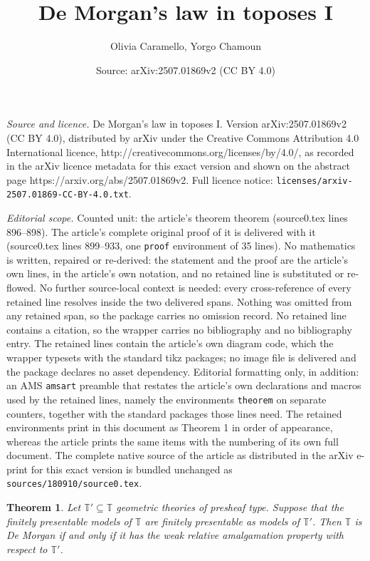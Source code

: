 \documentclass[10pt,a4paper]{amsart}
\title{De Morgan's law in toposes I}
\author{Olivia Caramello, Yorgo Chamoun}
\date{Source: arXiv:2507.01869v2 (CC BY 4.0)}
\newtheorem{theorem}{Theorem}
\newcommand{\T}{\mathbb{T}}
\begin{document}
\maketitle

\noindent\emph{Source and licence.} De Morgan's law in toposes I. Version arXiv:2507.01869v2 (CC BY 4.0), distributed by arXiv under the Creative Commons Attribution 4.0 International licence, http://creativecommons.org/licenses/by/4.0/, as recorded in the arXiv licence metadata for this exact version and shown on the abstract page https://arxiv.org/abs/2507.01869v2. Full licence notice: \texttt{licenses/arxiv-2507.01869-CC-BY-4.0.txt}.\par\smallskip

\noindent\textit{Editorial scope.} Counted unit: the article's theorem theorem (source0.tex lines 896--898). The article's complete original proof of it is delivered with it (source0.tex lines 899--933, one \texttt{proof} environment of 35 lines). No mathematics is written, repaired or re-derived: the statement and the proof are the article's own lines, in the article's own notation, and no retained line is substituted or re-flowed.  No further source-local context is needed: every cross-reference of every retained line resolves inside the two delivered spans.  Nothing was omitted from any retained span, so the package carries no omission record.  No retained line contains a citation, so the wrapper carries no bibliography and no bibliography entry.  The retained lines contain the article's own diagram code, which the wrapper typesets with the standard tikz packages; no image file is delivered and the package declares no asset dependency.  Editorial formatting only, in addition: an AMS \texttt{amsart} preamble that restates the article's own declarations and macros used by the retained lines, namely the environments \texttt{theorem} on separate counters, together with the standard packages those lines need.  The retained environments print in this document as Theorem 1 in order of appearance, whereas the article prints the same items with the numbering of its own full document.  The complete native source of the article as distributed in the arXiv e-print for this exact version is bundled unchanged as \texttt{sources/180910/source0.tex}.
\begin{theorem}
    Let $\T'\subseteq\T$ geometric theories of presheaf type. Suppose that the finitely presentable models of $\T$ are finitely presentable as models of $\T'$. Then $\T$ is De Morgan if and only if it has the weak relative amalgamation property with respect to $\T'$.
\end{theorem}
\end{document}
